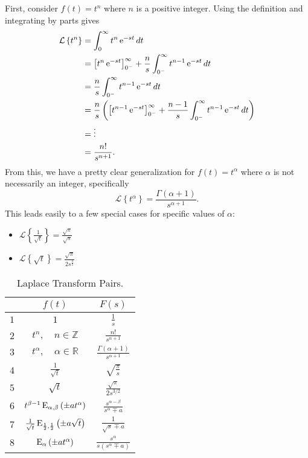     First, consider $f(t) = t^n$ where $n$ is a positive integer. Using the definition and integrating by parts gives
    \begin{align*}
      \mathcal L \left\{ t^n \right\} &= 
      \int_0^\infty t^n \operatorname{e}^{-s t} dt \\
      &= \left[ t^{n} \operatorname{e}^{-s t} \right]_{0^-}^\infty + \frac{n}{s} \int_{0^-}^\infty t^{n-1} \operatorname{e}^{-s t} dt \\
      &= \frac{n}{s} \int_{0^-}^\infty t^{n-1} \operatorname{e}^{-s t} dt \\
      &= \frac{n}{s} \left( \left[ t^{n-1} \operatorname{e}^{-s t} \right]_{0^-}^\infty + \frac{n-1}{s} \int_{0^-}^\infty t^{n-1} \operatorname{e}^{-s t} dt \right) \\
	&= \vdots  \\
	&= \frac{n!}{s^{n+1}}.
    \end{align*}
    From this, we have a pretty clear generalization for $f(t) = t^\alpha$ where $\alpha$ is not necessarily an integer, specifically
    \begin{equation*}
      \mathcal L \left\{ t^\alpha \right\} = \frac{\Gamma(\alpha + 1)}{s^{\alpha + 1}}.
    \end{equation*}
    This leads easily to a few special cases for specific values of $\alpha$:
    \begin{itemize}
      \item $\mathcal L \left\{ \frac{1}{\sqrt{t}} \right\} = \frac{\sqrt{\pi}}{\sqrt{s}}$
      \item $\mathcal L \left\{ \sqrt{t} \right\} = \frac{\sqrt{\pi}}{2 s^\frac{3}{2}}$
    \end{itemize}

    \begin{table}
      \centering
      \begin{tabular}{|c|c|c|}
	\hline
	 & $f(t)$ & $F(s)$ \\ \hline
	$1$ & $1$ & $\frac{1}{s}$ \\ \hline
	$2$ & $t^n, \quad n \in \mathbb Z$ & $\frac{n!}{s^{n+1}}$ \\ \hline
	$3$ & $t^\alpha, \quad \alpha \in \mathbb R$ & $\frac{\Gamma(\alpha + 1)}{s^{\alpha + 1}}$ \\ \hline
	$4$ & $\frac{1}{\sqrt{t}}$ & $\sqrt{\frac{\pi}{s}} $ \\ \hline
	$5$ & $\sqrt{t}$ & $\frac{\sqrt{\pi}}{2 s^{3/2}} $ \\ \hline
	$6$ & $t^{\beta - 1} \operatorname{E}_{\alpha,\beta}\left( \pm a t^\alpha \right)$ & $ \frac{s^{\alpha - \beta}}{s^\alpha \mp a}$ \\ \hline
	$7$ & $\frac{1}{\sqrt{t}} \operatorname{E}_{\frac{1}{2},\frac{1}{2}}\left( \pm a \sqrt{t} \right)$ & $ \frac{1}{\sqrt{s} \mp a}$ \\ \hline
	$8$ & $\operatorname{E}_{\alpha}\left( \pm a t^\alpha \right)$ & $ \frac{s^{\alpha}}{s \left( s^\alpha \mp a \right)}$ \\ \hline
      \end{tabular}
      \caption{Laplace Transform Pairs.}
      \label{tab:ltpairs}
    \end{table}

